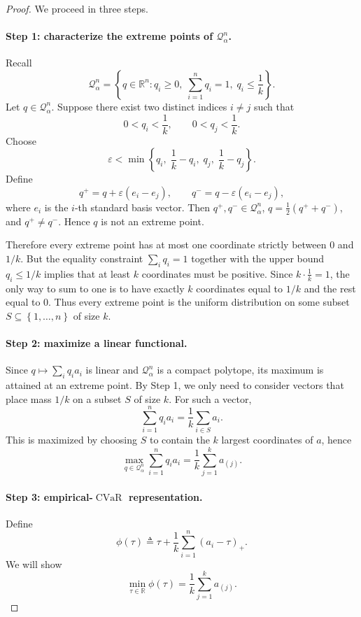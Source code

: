 \documentclass{article}
\newcommand{\RR}{\mathbb{R}}
\newcommand{\cQ}{\mathcal{Q}}
\newcommand{\CVaR}{\operatorname{CVaR}}
\newcommand{\braces}[1]{\left\{ #1 \right\}}
\begin{document}
\begin{proof}
We proceed in three steps.

\paragraph{Step 1: characterize the extreme points of \(\cQ_\alpha^n\).}
Recall
\[
\cQ_\alpha^n
=
\braces{
q\in\RR^n :
q_i\ge 0,\;
\sum_{i=1}^{n} q_i = 1,\;
q_i \le \frac{1}{k}
}.
\]
Let \(q\in \cQ_\alpha^n\). Suppose there exist two distinct indices \(i\neq j\) such that
\[
0 < q_i < \frac{1}{k},
\qquad
0 < q_j < \frac{1}{k}.
\]
Choose
\[
\varepsilon
<
\min\braces{
q_i,\;
\frac{1}{k}-q_i,\;
q_j,\;
\frac{1}{k}-q_j
}.
\]
Define
\[
q^{+}= q + \varepsilon (e_i-e_j),
\qquad
q^{-}= q - \varepsilon (e_i-e_j),
\]
where \(e_i\) is the \(i\)-th standard basis vector. Then \(q^+,q^- \in \cQ_\alpha^n\), \(q=\frac{1}{2}(q^+ + q^-)\), and \(q^+\neq q^-\). Hence \(q\) is not an extreme point.

Therefore every extreme point has at most one coordinate strictly between \(0\) and \(1/k\). But the equality constraint \(\sum_i q_i = 1\) together with the upper bound \(q_i\le 1/k\) implies that at least \(k\) coordinates must be positive. Since \(k\cdot \frac{1}{k}=1\), the only way to sum to one is to have exactly \(k\) coordinates equal to \(1/k\) and the rest equal to \(0\). Thus every extreme point is the uniform distribution on some subset \(S\subseteq\braces{1,\ldots,n}\) of size \(k\).

\paragraph{Step 2: maximize a linear functional.}
Since \(q\mapsto \sum_i q_i a_i\) is linear and \(\cQ_\alpha^n\) is a compact polytope, its maximum is attained at an extreme point. By Step 1, we only need to consider vectors that place mass \(1/k\) on a subset \(S\) of size \(k\). For such a vector,
\[
\sum_{i=1}^{n} q_i a_i
=
\frac{1}{k}\sum_{i\in S} a_i.
\]
This is maximized by choosing \(S\) to contain the \(k\) largest coordinates of \(a\), hence
\[
\max_{q\in\cQ_\alpha^n}\sum_{i=1}^{n} q_i a_i
=
\frac{1}{k}\sum_{j=1}^{k} a_{(j)}.
\]

\paragraph{Step 3: empirical-\(\CVaR\) representation.}
Define
\[
\phi(\tau)
\triangleq
\tau + \frac{1}{k}\sum_{i=1}^{n} (a_i-\tau)_+.
\]
We will show
\[
\min_{\tau\in\RR}\phi(\tau)
=
\frac{1}{k}\sum_{j=1}^{k} a_{(j)}.
\]

\end{proof}
\end{document}
